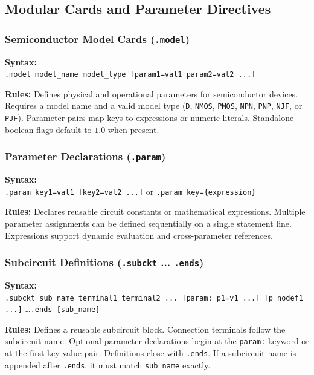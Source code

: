 \subsection{Modular Cards and Parameter Directives}

\subsubsection{Semiconductor Model Cards (\texttt{.model})}
\begin{compactitem}
    \item \textbf{Syntax:} \\
    \texttt{.model model\_name model\_type [param1=val1 param2=val2 ...]}
    \item \textbf{Rules:} Defines physical and operational parameters for semiconductor devices. Requires a model name and a valid model type (\texttt{D}, \texttt{NMOS}, \texttt{PMOS}, \texttt{NPN}, \texttt{PNP}, \texttt{NJF}, or \texttt{PJF}). Parameter pairs map keys to expressions or numeric literals. Standalone boolean flags default to $1.0$ when present.
\end{compactitem}

\subsubsection{Parameter Declarations (\texttt{.param})}
\begin{compactitem}
    \item \textbf{Syntax:} \\
    \texttt{.param key1=val1 [key2=val2 ...]} or \texttt{.param key=\{expression\}}
    \item \textbf{Rules:} Declares reusable circuit constants or mathematical expressions. Multiple parameter assignments can be defined sequentially on a single statement line. Expressions support dynamic evaluation and cross-parameter references.
\end{compactitem}

\subsubsection{Subcircuit Definitions (\texttt{.subckt} ... \texttt{.ends})}
\begin{compactitem}
    \item \textbf{Syntax:} \\
    \texttt{.subckt sub\_name terminal1 terminal2 ... [param: p1=v1 ...] [p\_nodef1 ...]} \dots \texttt{.ends [sub\_name]}
    \item \textbf{Rules:} Defines a reusable subcircuit block. Connection terminals follow the subcircuit name. Optional parameter declarations begin at the \texttt{param:} keyword or at the first key-value pair. Definitions close with \texttt{.ends}. If a subcircuit name is appended after \texttt{.ends}, it must match \texttt{sub\_name} exactly.
\end{compactitem}

